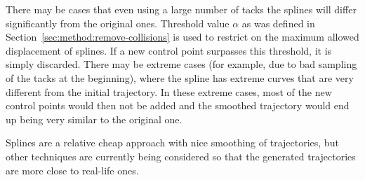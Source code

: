 There may be cases that even using a large number of tacks the splines will differ significantly from the original ones. 
Threshold value $\alpha$ as was defined in Section~\ref{sec:method:remove-collisions}  is used to restrict on the maximum allowed displacement of splines.
If a new control point surpasses this threshold, it is simply discarded.
There may be extreme cases (for example, due to bad sampling of the tacks at the beginning), where the spline has extreme curves that are very different from the initial trajectory.
In these extreme cases, most of the new control points would then not be added and the smoothed trajectory would end up being very similar to the original one.

Splines are a relative cheap approach with nice smoothing of trajectories, but other techniques are currently being considered so that the generated trajectories are more close to real-life ones.

